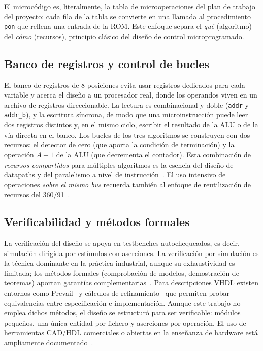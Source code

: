 \documentclass[llncs]{llncs}
\begin{document}
El microcódigo es, literalmente, la tabla de microoperaciones del plan de
trabajo del proyecto: cada fila de la tabla se convierte en una llamada al
procedimiento \texttt{pon} que rellena una entrada de la ROM. Este enfoque
separa el \emph{qué} (algoritmo) del \emph{cómo} (recursos), principio
clásico del diseño de control microprogramado.

\subsection{Banco de registros y control de bucles}

El banco de registros de 8 posiciones evita usar registros dedicados para
cada variable y acerca el diseño a un procesador real, donde los operandos
viven en un archivo de registros direccionable. La lectura es combinacional y
doble (\texttt{addr} y \texttt{addr\_b}), y la escritura síncrona, de modo que
una microinstrucción puede leer dos registros distintos y, en el mismo ciclo,
escribir el resultado de la ALU o de la vía directa en el banco. Los bucles de
los tres
algoritmos se construyen con dos recursos: el detector de cero (que aporta la
condición de terminación) y la operación $A-1$ de la ALU (que decrementa el
contador). Esta combinación de \emph{recursos compartidos} para múltiples
algoritmos es la esencia del diseño de datapaths y del paralelismo a nivel de
instrucción~\cite{tjaden1970}. El uso intensivo de operaciones \emph{sobre el
mismo bus} recuerda también al enfoque de reutilización de recursos del
360/91~\cite{anderson1967fp}.

\subsection{Verificabilidad y métodos formales}

La verificación del diseño se apoya en testbenches autochequeados, es decir,
simulación dirigida por estímulos con aserciones. La verificación por
simulación es la técnica dominante en la práctica industrial, aunque su
exhaustividad es limitada; los métodos formales (comprobación de modelos,
demostración de teoremas) aportan garantías
complementarias~\cite{gupta1992,kern1999}. Para descripciones VHDL existen
entornos como Prevail~\cite{borrione1992} y cálculos de
refinamiento~\cite{breuer1997} que permiten probar equivalencias entre
especificación e implementación. Aunque este trabajo no emplea dichos
métodos, el diseño se estructuró para ser verificable: módulos pequeños, una
única entidad por fichero y aserciones por operación. El uso de herramientas
CAD/HDL comerciales o abiertas en la enseñanza de hardware está ampliamente
documentado~\cite{puvvada1993}.
\end{document}
